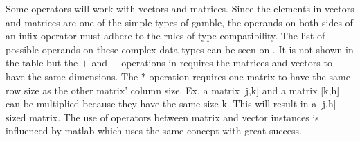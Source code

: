 
Some operators will work with vectors and matrices.
Since the elements in vectors and matrices are one of the simple types of \gls{gamble}, the operands on both sides of an infix operator must adhere to the rules of type compatibility.
The list of possible operands on these complex data types can be seen on .
It is not shown in the table but the $+$ and $-$ operations in  requires the matrices and vectors to have the same dimensions.
The $*$ operation requires one matrix to have the same row size as the other matrix' column size. Ex. a matrix [j,k] and a matrix [k,h] can be multiplied because they have the same size k.
This will result in a [j,h] sized matrix.
The use of operators between matrix and vector instances is influenced by matlab which uses the same concept with great success.

